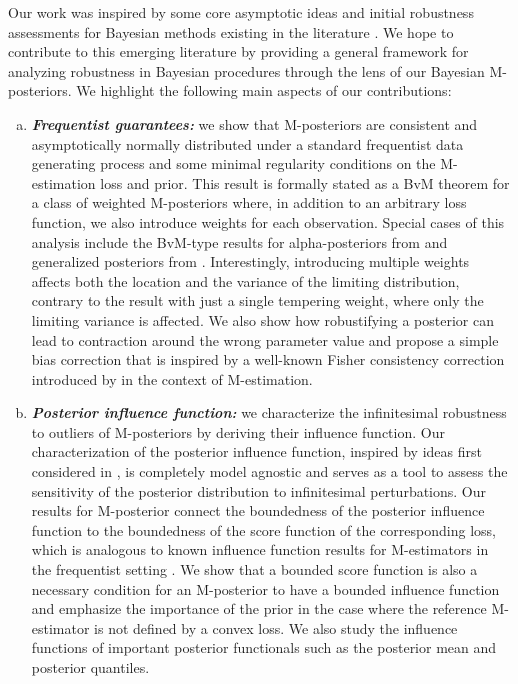 \documentclass[11pt, oneside]{amsart}
\theoremstyle{definition}   %
\begin{document}
Our work was inspired  by some core asymptotic ideas and initial robustness assessments for Bayesian methods existing in the literature \cite{chernozhukov:hong2003, kleijn:vandervaart2012,hooker:vidyashankar2014,ghosh:basu2016,wang:kucukelbir:blei2017,matsubara:knoblauch:briol:oates2022}. We hope to contribute to this emerging literature by providing a general framework for analyzing robustness in Bayesian procedures through the lens of our Bayesian M-posteriors. We highlight the following main aspects of our contributions:
%
\begin{enumerate}[(a)]
    \item \textbf{\emph{Frequentist guarantees:}} we show that M-posteriors are consistent and asymptotically normally distributed under a standard frequentist data generating process and some minimal regularity conditions on the M-estimation loss and prior. This result is formally stated as a BvM theorem for a class of weighted M-posteriors where, in addition to an arbitrary loss function, we also introduce weights for each observation.  Special cases of this analysis include the BvM-type results for  alpha-posteriors from \cite{avellamedinaetal2021} and generalized posteriors from \cite{chernozhukov:hong2003}.  Interestingly, introducing multiple weights affects both the location and the variance of the limiting distribution, contrary to the result with just a single tempering weight, where only the limiting variance is affected.  We also show how robustifying a posterior can lead to contraction around the wrong parameter value and propose a simple bias correction that is inspired by a well-known Fisher consistency correction introduced by \cite{huber1964} in the context of M-estimation.
%
    \item 
\textbf{\emph{Posterior influence function:}} we characterize the infinitesimal robustness to outliers of M-posteriors by deriving their influence function.  Our characterization of the posterior influence function, inspired by ideas first considered in \cite{ghosh:basu2016, matsubara:knoblauch:briol:oates2022}, is completely model agnostic and serves as a tool to assess the sensitivity of the posterior distribution to infinitesimal perturbations. Our results for M-posterior connect the boundedness of the posterior influence function to the boundedness of the score function of the corresponding loss, which is analogous to known influence function results for M-estimators in the frequentist setting \citep{hampeletal1986}.  We show that a bounded score function is also a necessary condition for an M-posterior to have a bounded influence function and emphasize the importance of the prior in the case where the reference M-estimator is not defined by a convex loss.  We also study  the influence functions of important posterior functionals such as the posterior mean and posterior quantiles. 

\end{enumerate}
\end{document}
